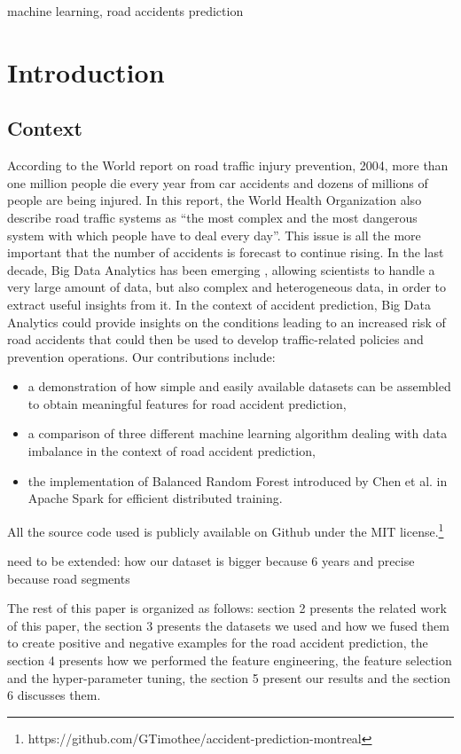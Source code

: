 \documentclass[conference]{IEEEtran}
\begin{document}
\begin{IEEEkeywords}
machine learning, road accidents prediction
\end{IEEEkeywords}

\section{Introduction}
\subsection{Context}
According to the World report on road traffic injury prevention, 2004, more than one million people die every year from car accidents and dozens of millions of people are being injured\cite{Peden2004}. In this report, the World Health Organization also describe road traffic systems as “the most complex and the most dangerous system with which people have to deal every day”. This issue is all the more important that the number of accidents is forecast to continue rising. In the last decade, Big Data Analytics has been emerging \cite{Gandomi2015}, allowing scientists to handle a very large amount of data, but also complex and heterogeneous data, in order to extract useful insights from it. In the context of accident prediction, Big Data Analytics could provide insights on the conditions leading to an increased risk of road accidents that could then be used to develop traffic-related policies and prevention operations. Our contributions include: 
\begin{itemize}
\item a demonstration of how simple and easily available datasets can be assembled to obtain meaningful features for road accident prediction,
\item a comparison of three different machine learning algorithm dealing with data imbalance in the context of road accident prediction,
\item the implementation of Balanced Random Forest introduced by Chen et al.\cite{Chen2004} in Apache Spark for efficient distributed training. 
\end{itemize}
All the source code used is publicly available on Github under the MIT license.\footnote{https://github.com/GTimothee/accident-prediction-montreal}

need to be extended:
  how our dataset is bigger because 6 years and precise because road segments


The rest of this paper is organized as follows: section 2 presents the related work of this paper, the section 3 presents the datasets we used and how we fused them to create positive and negative examples for the road accident prediction, the section 4 presents how we performed the feature engineering, the feature selection and the hyper-parameter tuning, the section 5 present our results and the section 6 discusses them.
\end{document}
